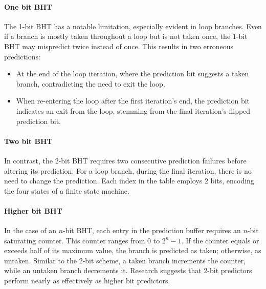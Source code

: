 \paragraph*{One bit BHT}
The 1-bit BHT has a notable limitation, especially evident in loop branches. 
Even if a branch is mostly taken throughout a loop but is not taken once, the 1-bit BHT may mispredict twice instead of once. 
This results in two erroneous predictions:
\begin{itemize}
    \item At the end of the loop iteration, where the prediction bit suggests a taken branch, contradicting the need to exit the loop.
    \item When re-entering the loop after the first iteration's end, the prediction bit indicates an exit from the loop, stemming from the final iteration's flipped prediction bit.
\end{itemize}

\paragraph*{Two bit BHT}
In contrast, the 2-bit BHT requires two consecutive prediction failures before altering its prediction. 
For a loop branch, during the final iteration, there is no need to change the prediction.
 Each index in the table employs 2 bits, encoding the four states of a finite state machine.

\paragraph*{Higher bit BHT}
In the case of an $n$-bit BHT, each entry in the prediction buffer requires an $n$-bit saturating counter. 
This counter ranges from $0$ to $2^n-1$.
If the counter equals or exceeds half of its maximum value, the branch is predicted as taken; otherwise, as untaken.
Similar to the 2-bit scheme, a taken branch increments the counter, while an untaken branch decrements it. 
Research suggests that 2-bit predictors perform nearly as effectively as higher bit predictors.

